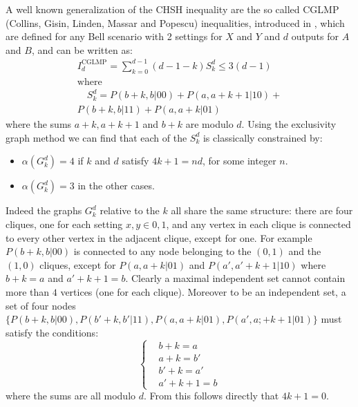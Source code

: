 \documentclass[letterpaper]{article}
\begin{document}
A well known generalization of the CHSH inequality are the so called CGLMP
(Collins, Gisin, Linden, Massar and Popescu) inequalities, introduced in \cite{cglmp}, which are defined for any Bell scenario with 2
settings for $X$ and $Y$ and $d$ outputs for $A$ and $B$, and can be written as:
\begin{gather}
    I_d^{\mathrm{CGLMP}} = \sum_{k=0}^{d-1} (d-1-k) S^d_k \le 3 (d-1)\\ \nonumber
    \text{where}\\
    \quad S^d_k = P(b+k,b|00) + P(a, a+k+1|10) +\\ \nonumber
    P(b+k, b | 11) +
    P(a, a+k | 01)
    \label{eq:GCLMP}
\end{gather}
where the sums $a+k, a+k+1$ and $b+k$ are modulo $d$.
Using the exclusivity graph method we can find that each of the $S^d_k$ is
classically constrained by:
\begin{itemize}
    \item $\alpha(G^d_k) = 4$ if $k$ and $d$ satisfy $4k+1=n d$, for some
        integer $n$.
    \item $\alpha(G^d_k) = 3$ in the other cases.
\end{itemize}
Indeed the graphs $G^d_k$ relative to the $k$ all share the same structure:
there are four cliques, one for each setting $x,y \in {0,1}$, and any vertex in each clique is
connected to every other vertex in the adjacent clique, except for one.
For example $P(b+k,b|00)$ is connected to any node belonging to the $(0,1)$ and the
$(1,0)$ cliques, except for $P(a,a+k|01)$ and $P(a',a'+k+1|10)$ where $b+k = a$ and
$a'+k+1 = b$.
Clearly a maximal independent set cannot contain more than $4$ vertices (one for
each clique).
Moreover to be an independent set, a set of four nodes $\{P(b+k,b|00),
P(b'+k,b'|11), P(a,a+k|01), P(a',a;+k+1|01)\}$ must satisfy the conditions:
\begin{equation}
    \left\{
        \begin{aligned}
            &b + k = a \\
            &a + k = b' \\
            &b' + k = a' \\
            &a' + k + 1 = b 
        \end{aligned}
    \right.
    \label{eq:four_indipset_condition}
\end{equation}
where the sums are all modulo $d$.
From this follows directly that $4k+1 = 0$. 
\end{document}

